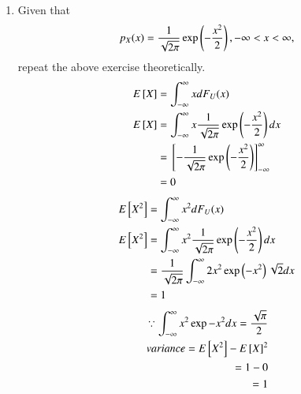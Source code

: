 \documentclass[journal,12pt,twocolumn]{IEEEtran}
\renewcommand\thesection{\arabic{section}}
\begin{document}
\begin{enumerate}[label=\thesection.\arabic*
,ref=\thesection.\theenumi]
\begin{lstlisting}
./out
\end{lstlisting}
\item Given that 
\begin{align}
p_{X}(x) = \frac{1}{\sqrt{2\pi}}\exp\left(-\frac{x^2}{2}\right), -\infty < x < \infty,
\end{align}
repeat the above exercise theoretically.\\
\solution 
\begin{align}
E{}\left[X\right] & = \int_{-\infty}^{\infty}x dF_{U}(x)\\
E{}\left[X\right] & = \int_{-\infty}^{\infty}x \frac{1}{\sqrt{2\pi}}\exp\left(-\frac{x^2}{2}\right)dx\\ & = {}\left[-\frac{1}{\sqrt{2\pi}}\exp\left(-\frac{x^2}{2}\right)\right]_{-\infty}^{\infty}\\ & = 0
\end{align}
\begin{align}
E{}\left[X^2\right] & = \int_{-\infty}^{\infty}x^2 dF_{U}(x) \\
E{}\left[X^2\right] & = \int_{-\infty}^{\infty}x^2 \frac{1}{\sqrt{2\pi}}\exp\left(-\frac{x^2}{2}\right)dx\\& = \frac{1}{\sqrt{2\pi}} \int_{-\infty}^{\infty} 2x^2 \exp\left(-x^2\right) \sqrt{2}dx\\& = 1
\end{align}
\begin{align}
\because \int_{-\infty}^{\infty} x^2 \exp{-x^2}dx = \frac{\sqrt{\pi}}{2}\\
variance = E{}\left[X^2\right] - {E{}\left[X\right]}^2\\ = 1-0 \\ = 1
\end{align}
%
\end{enumerate}
\end{document}
